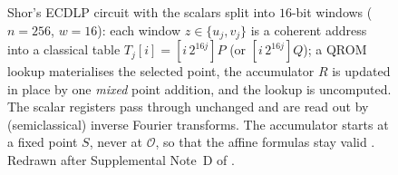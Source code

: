 \begin{figure}[H]
\centering
{}
\caption{Shor's ECDLP circuit with the scalars split into $16$-bit windows ($n=256$, $w=16$): each window $z\in\{u_j,v_j\}$ is a coherent address into a classical table $T_j[i]=[i\,2^{16j}]P$ (or $[i\,2^{16j}]Q$); a QROM lookup materialises the selected point, the accumulator $R$ is updated in place by one \emph{mixed} point addition, and the lookup is uncomputed. The scalar registers pass through unchanged and are read out by (semiclassical) inverse Fourier transforms. The accumulator starts at a fixed point $S$, never at $\mathcal O$, so that the affine formulas stay valid \cite{schrottenloher26,haener26}. Redrawn after Supplemental Note~D of \cite{ecdsafail26}.}
\label{fig:shor-ecdlp}
\end{figure}


